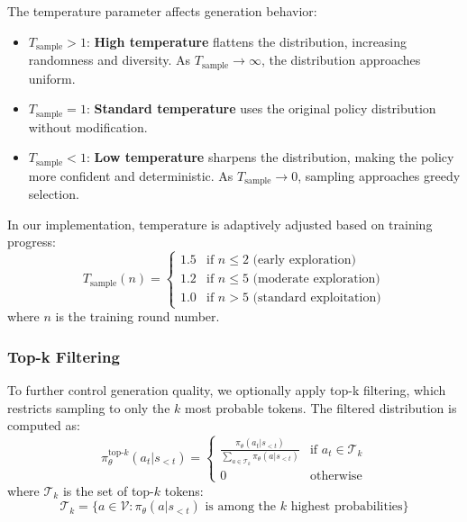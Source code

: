\documentclass[conference]{IEEEtran}
\begin{document}
The temperature parameter affects generation behavior:
\begin{itemize}
    \item $T_{\text{sample}} > 1$: \textbf{High temperature} flattens the distribution, increasing randomness and diversity. As $T_{\text{sample}} \to \infty$, the distribution approaches uniform.
    
    \item $T_{\text{sample}} = 1$: \textbf{Standard temperature} uses the original policy distribution without modification.
    
    \item $T_{\text{sample}} < 1$: \textbf{Low temperature} sharpens the distribution, making the policy more confident and deterministic. As $T_{\text{sample}} \to 0$, sampling approaches greedy selection.
\end{itemize}

In our implementation, temperature is adaptively adjusted based on training progress:
\begin{equation}
T_{\text{sample}}(n) = \begin{cases}
1.5 & \text{if } n \leq 2 \text{ (early exploration)} \\
1.2 & \text{if } n \leq 5 \text{ (moderate exploration)} \\
1.0 & \text{if } n > 5 \text{ (standard exploitation)}
\end{cases}
\end{equation}
where $n$ is the training round number.

\subsubsection{Top-k Filtering}

To further control generation quality, we optionally apply top-k filtering, which restricts sampling to only the $k$ most probable tokens. The filtered distribution is computed as:
\begin{equation}
\pi_\theta^{\text{top-}k}(a_t | s_{<t}) = \begin{cases}
\frac{\pi_\theta(a_t | s_{<t})}{\sum_{a \in \mathcal{T}_k} \pi_\theta(a | s_{<t})} & \text{if } a_t \in \mathcal{T}_k \\
0 & \text{otherwise}
\end{cases}
\end{equation}
where $\mathcal{T}_k$ is the set of top-$k$ tokens:
\begin{equation}
\mathcal{T}_k = \{a \in \mathcal{V} : \pi_\theta(a | s_{<t}) \text{ is among the } k \text{ highest probabilities}\}
\end{equation}
\end{document}
